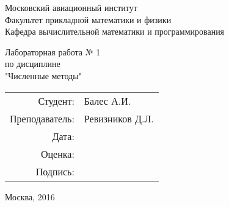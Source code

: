 \thispagestyle{empty}

\begin{center}
Московский авиационный институт\\
\vspace{0.5cm}
Факультет прикладной математики и физики\\
\vspace{0.5cm}
Кафедра вычислительной математики и программирования\\

\vspace{3cm}

Лабораторная работа № 1\\
по дисциплине\\
"Численные методы"\\
\end{center}

\vspace{3cm}

\begin{flushright}
\begin{tabular}{rl}
Студент: & Балес А.И.\\
Преподаватель: & Ревизников Д.Л. \\
Дата: & \\
Оценка: & \\
Подпись: & \\
\end{tabular}
\end{flushright}

\vspace{5cm}

\begin{center}
Москва, 2016
\end{center}

\pagebreak
